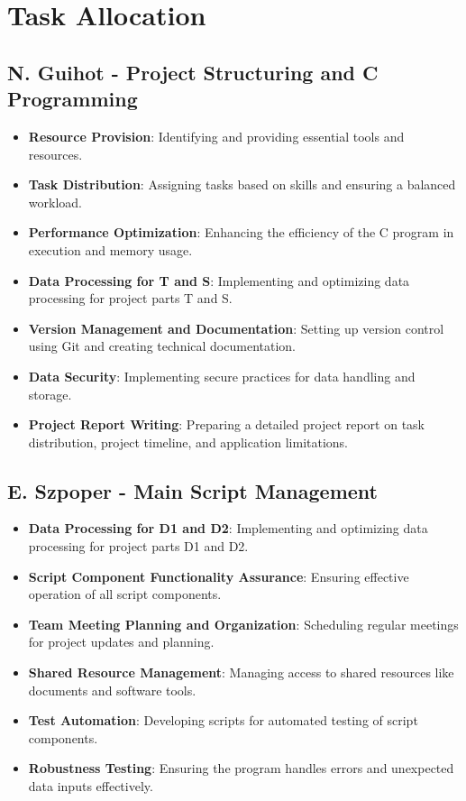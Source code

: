 \documentclass[11pt]{article}
\begin{document}
\newpage
\section{Task Allocation}
\subsection{N. Guihot - Project Structuring and C Programming}
\begin{itemize}
    \item \textbf{Resource Provision}: Identifying and providing essential tools and resources.
    \item \textbf{Task Distribution}: Assigning tasks based on skills and ensuring a balanced workload.
    \item \textbf{Performance Optimization}: Enhancing the efficiency of the C program in execution and memory usage.
    \item \textbf{Data Processing for T and S}: Implementing and optimizing data processing for project parts T and S.
    \item \textbf{Version Management and Documentation}: Setting up version control using Git and creating technical documentation.
    \item \textbf{Data Security}: Implementing secure practices for data handling and storage.
    \item \textbf{Project Report Writing}: Preparing a detailed project report on task distribution, project timeline, and application limitations.
\end{itemize}

\subsection{E. Szpoper - Main Script Management}
\begin{itemize}
    \item \textbf{Data Processing for D1 and D2}: Implementing and optimizing data processing for project parts D1 and D2.
    \item \textbf{Script Component Functionality Assurance}: Ensuring effective operation of all script components.
    \item \textbf{Team Meeting Planning and Organization}: Scheduling regular meetings for project updates and planning.
    \item \textbf{Shared Resource Management}: Managing access to shared resources like documents and software tools.
    \item \textbf{Test Automation}: Developing scripts for automated testing of script components.
    \item \textbf{Robustness Testing}: Ensuring the program handles errors and unexpected data inputs effectively.
\end{itemize}
\end{document}

